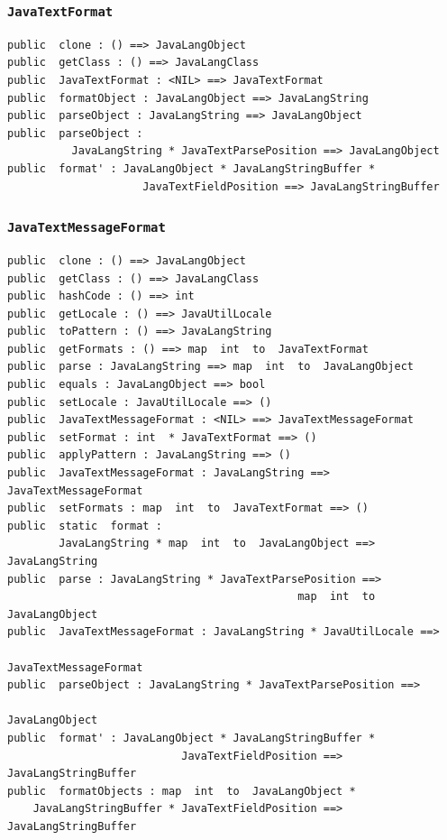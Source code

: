 \documentclass[\pformat,12pt]{article}
\begin{document}
\subsubsection{\texttt{JavaTextFormat}}
\begin{small}
\begin{verbatim}
public  clone : () ==> JavaLangObject
public  getClass : () ==> JavaLangClass
public  JavaTextFormat : <NIL> ==> JavaTextFormat
public  formatObject : JavaLangObject ==> JavaLangString
public  parseObject : JavaLangString ==> JavaLangObject
public  parseObject : 
          JavaLangString * JavaTextParsePosition ==> JavaLangObject
public  format' : JavaLangObject * JavaLangStringBuffer * 
                     JavaTextFieldPosition ==> JavaLangStringBuffer
\end{verbatim}
\end{small}

\subsubsection{\texttt{JavaTextMessageFormat}}
\begin{small}
\begin{verbatim}
public  clone : () ==> JavaLangObject
public  getClass : () ==> JavaLangClass
public  hashCode : () ==> int
public  getLocale : () ==> JavaUtilLocale
public  toPattern : () ==> JavaLangString
public  getFormats : () ==> map  int  to  JavaTextFormat
public  parse : JavaLangString ==> map  int  to  JavaLangObject
public  equals : JavaLangObject ==> bool
public  setLocale : JavaUtilLocale ==> ()
public  JavaTextMessageFormat : <NIL> ==> JavaTextMessageFormat
public  setFormat : int  * JavaTextFormat ==> ()
public  applyPattern : JavaLangString ==> ()
public  JavaTextMessageFormat : JavaLangString ==> JavaTextMessageFormat
public  setFormats : map  int  to  JavaTextFormat ==> ()
public  static  format : 
        JavaLangString * map  int  to  JavaLangObject ==> JavaLangString
public  parse : JavaLangString * JavaTextParsePosition ==> 
                                             map  int  to  JavaLangObject
public  JavaTextMessageFormat : JavaLangString * JavaUtilLocale ==> 
                                                    JavaTextMessageFormat
public  parseObject : JavaLangString * JavaTextParsePosition ==> 
                                                           JavaLangObject
public  format' : JavaLangObject * JavaLangStringBuffer * 
                           JavaTextFieldPosition ==> JavaLangStringBuffer
public  formatObjects : map  int  to  JavaLangObject * 
    JavaLangStringBuffer * JavaTextFieldPosition ==> JavaLangStringBuffer
\end{verbatim}
\end{small}
\end{document}
